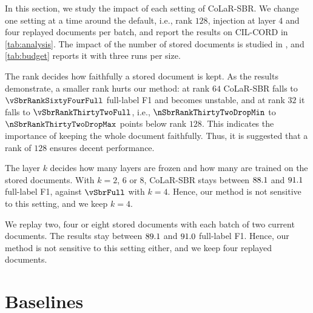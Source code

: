 \label{app:analysis} In this section, we study the impact of each setting of CoLaR-SBR. We change one setting at a time around the default, i.e., rank $128$, injection at layer $4$ and four replayed documents per batch, and report the results on CIL-CORD in \cref{tab:analysis}. The impact of the number of stored documents is studied in , and \cref{tab:budget} reports it with three runs per size.

\begin{table}[h]
\centering\small
\setlength{\tabcolsep}{4pt}
\caption{\textbf{Model analysis} of CoLaR-SBR on CIL-CORD: one setting changes at a time (bold: the default). Mean $\pm$ s.d.\ of three runs.}
\label{tab:analysis}
\resizebox{\linewidth}{!}{}
\end{table}

 The rank decides how faithfully a stored document is kept. As the results demonstrate, a smaller rank hurts our method: at rank $64$ CoLaR-SBR falls to $\vSbrRankSixtyFourFull$ full-label F1 and becomes unstable, and at rank $32$ it falls to $\vSbrRankThirtyTwoFull$, i.e., $\nSbrRankThirtyTwoDropMin$ to $\nSbrRankThirtyTwoDropMax$ points below rank $128$. This indicates the importance of keeping the whole document faithfully. Thus, it is suggested that a rank of $128$ ensures decent performance.

 The layer $k$ decides how many layers are frozen and how many are trained on the stored documents. With $k=2$, $6$ or $8$, CoLaR-SBR stays between $88.1$ and $91.1$ full-label F1, against $\vSbrFull$ with $k=4$. Hence, our method is not sensitive to this setting, and we keep $k=4$.

 We replay two, four or eight stored documents with each batch of two current documents. The results stay between $89.1$ and $91.0$ full-label F1. Hence, our method is not sensitive to this setting either, and we keep four replayed documents.

\section{Baselines}
\label{app:baselines}

\begin{table}[t]
\centering\scriptsize
\setlength{\tabcolsep}{3pt}
\caption{\textbf{Baseline card} (the methods of ): what our re-implementation changes against the published method, and what it keeps across sessions.}
\label{tab:baselinecard}

\end{table}

